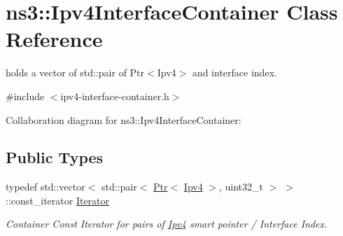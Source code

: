 \hypertarget{classns3_1_1Ipv4InterfaceContainer}{}\section{ns3\+:\+:Ipv4\+Interface\+Container Class Reference}
\label{classns3_1_1Ipv4InterfaceContainer}


holds a vector of std\+::pair of Ptr$<$\+Ipv4$>$ and interface index.  




{\ttfamily \#include $<$ipv4-\/interface-\/container.\+h$>$}



Collaboration diagram for ns3\+:\+:Ipv4\+Interface\+Container\+:
\subsection*{Public Types}
\begin{DoxyCompactItemize}
\item 
typedef std\+::vector$<$ std\+::pair$<$ \hyperlink{classns3_1_1Ptr}{Ptr}$<$ \hyperlink{classns3_1_1Ipv4}{Ipv4} $>$, uint32\+\_\+t $>$ $>$\+::const\+\_\+iterator \hyperlink{classns3_1_1Ipv4InterfaceContainer_acedc286abfd3db405dfca5ddd73fd1d7}{Iterator}
\begin{DoxyCompactList}\small\item\em Container Const Iterator for pairs of \hyperlink{classns3_1_1Ipv4}{Ipv4} smart pointer / Interface Index. \end{DoxyCompactList}\end{DoxyCompactItemize}
